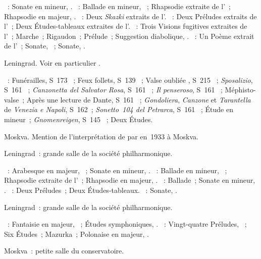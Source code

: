 \begin{description}
 \textsc{\Schumann{}}~: Sonate en \kG mineur, .
 \textsc{\Brahms{}}~: Ballade en \kG mineur,  ~;
 Rhapsodie extraite de l'~; Rhapsodie en \kE \Flat majeur,
  .
 \textsc{\Medtner{}}~: Deux \emph{Skazki} extraits de l'.
 \textsc{\Rachmaninov{}}~: Deux Préludes extraits de l'~; Deux
 Études-tableaux extraites de l'.
 \textsc{\Prokofiev{}}~: Trois Visions fugitives extraites de l'~;
 Marche~; Rigaudon~; Prélude~; Suggestion diabolique,  .
 \textsc{\Scriabine{}}~: Un Poème extrait de l'~; Sonate,
 ~; Sonate, .
 \item[\DateWithWeekDay{1933-04-19}]
 Leningrad.
 Voir en particulier \citet[p.~427]{Milshteyn82a}.

 \textsc{\Liszt{}}~: Funérailles, S~173 ~; Feux follets, S~139
 ~; Valse oubliée , S~215 ~;
 \emph{Sposalizio}, S~161 ~; \emph{Canzonetta del Salvator Rosa},
 S~161 ~; \emph{Il penseroso}, S~161 ~; Méphisto-valse~;
 Après une lecture de Dante, S~161 ~; \emph{Gondoliera},
 \emph{Canzone} et \emph{Tarantella} de \emph{Venezia e Napoli}, S~162~;
 \emph{Sonetto~104 del Petrarca}, S~161 ~; Étude en \kF mineur~;
 \emph{Gnomenreigen}, S~145 ~; Deux Études.
 \item[\DateWithWeekDay{1933-04-20}]
 Moskva.
 Mention de l'interprétation de  par
 \VSofronitsky{} en~1933 à Moskva.
 \item[\DateWithWeekDay{1933-04-25}]
 Leningrad~: grande salle de la société philharmonique.

 \textsc{\Schumann{}}~: Arabesque en \kC majeur, ~; Sonate en \kG
 mineur, .
 \textsc{\Brahms{}}~: Ballade en \kG mineur,  ~;
 Rhapsodie extraite de l'~; Rhapsodie en \kE \Flat majeur,
  .
 \textsc{\Chopin{}}~: Ballade~; Sonate en \kB \Flat mineur, .
 \textsc{\Rachmaninov{}}~: Deux Préludes~; Deux Études-tableaux.
 \textsc{\Scriabine{}}~: Sonate, .
 \item[\DateWithWeekDay{1933-05-27}]
 Leningrad~: grande salle de la société philharmonique.

 \textsc{\Schumann{}}~: Fantaisie en \kC majeur, ~; Études
 symphoniques, .
 \textsc{\Chopin{}}~: Vingt-quatre Préludes, ~; Six Études~;
 Mazurka~; Polonaise en \kA \Flat majeur, .
 \item[\DateWithWeekDay{1933-06-04}]
 Moskva~: petite salle du conservatoire.


\end{description}
